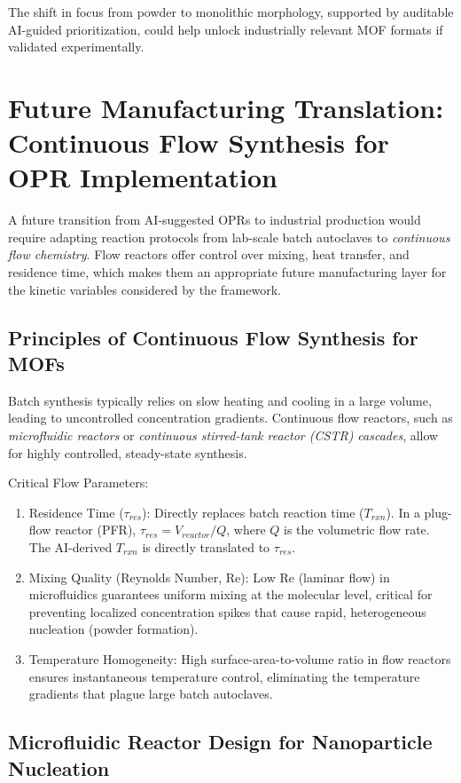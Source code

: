 \documentclass[12pt,a4paper]{article}
\begin{document}
The shift in focus from powder to monolithic morphology, supported by auditable AI-guided prioritization, could help unlock industrially relevant MOF formats if validated experimentally.

\section{Future Manufacturing Translation: Continuous Flow Synthesis for OPR Implementation}

A future transition from AI-suggested OPRs to industrial production would require adapting reaction protocols from lab-scale batch autoclaves to \textit{continuous flow chemistry}. Flow reactors offer control over mixing, heat transfer, and residence time, which makes them an appropriate future manufacturing layer for the kinetic variables considered by the framework.\cite{ref39}

\subsection{Principles of Continuous Flow Synthesis for MOFs}

Batch synthesis typically relies on slow heating and cooling in a large volume, leading to uncontrolled concentration gradients. Continuous flow reactors, such as \textit{microfluidic reactors} or \textit{continuous stirred-tank reactor (CSTR) cascades}, allow for highly controlled, steady-state synthesis.

Critical Flow Parameters:
\begin{enumerate}
    \item Residence Time ($\tau_{res}$): Directly replaces batch reaction time ($T_{rxn}$). In a plug-flow reactor (PFR), $\tau_{res} = V_{reactor} / Q$, where $Q$ is the volumetric flow rate. The AI-derived $T_{rxn}$ is directly translated to $\tau_{res}$.
    \item Mixing Quality (Reynolds Number, $\text{Re}$): Low $\text{Re}$ (laminar flow) in microfluidics guarantees uniform mixing at the molecular level, critical for preventing localized concentration spikes that cause rapid, heterogeneous nucleation (powder formation).
    \item Temperature Homogeneity: High surface-area-to-volume ratio in flow reactors ensures instantaneous temperature control, eliminating the temperature gradients that plague large batch autoclaves.
\end{enumerate}

\subsection{Microfluidic Reactor Design for Nanoparticle Nucleation}
\end{document}
